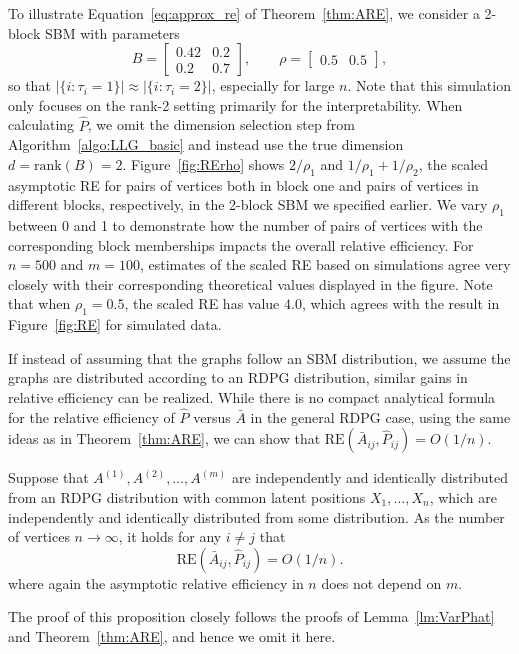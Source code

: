 To illustrate Equation~\ref{eq:approx_re} of Theorem~\ref{thm:ARE}, we consider a 2-block SBM with parameters
\begin{equation}
B = \begin{bmatrix}
0.42 & 0.2 \\
0.2 & 0.7
\end{bmatrix}
,\qquad \rho = \begin{bmatrix}
0.5 & 0.5
\end{bmatrix},
\label{eq:sim_setting}
\end{equation}
so that $|\{i:\tau_i=1\}| \approx |\{i:\tau_i=2\}|$, especially for large $n$.
Note that this simulation only focuses on the rank-2 setting primarily for the interpretability.
When calculating $\hat{P}$, we omit the dimension selection step from Algorithm~\ref{algo:LLG_basic} and instead use the true dimension $d = \mathrm{rank}(B) = 2$.
Figure~\ref{fig:RErho} shows $2/\rho_1$ and $1/\rho_1+1/\rho_2$, the scaled asymptotic RE for pairs of vertices both in block one and pairs of vertices in different blocks, respectively, in the 2-block SBM we specified earlier.
We vary $\rho_1$ between 0 and 1 to demonstrate how the number of pairs of vertices with the corresponding block memberships impacts the overall relative efficiency.
For $n=500$ and $m=100$, estimates of the scaled RE based on simulations agree very closely with their corresponding theoretical values displayed in the figure. Note that when $\rho_1 = 0.5$, the scaled RE has value $4.0$, which agrees with the result in Figure~\ref{fig:RE} for simulated data.


If instead of assuming that the graphs follow an SBM distribution, we assume the graphs are distributed according to an RDPG distribution, similar gains in relative efficiency can be realized.
While there is no compact analytical formula for the relative efficiency of $\hat{P}$ versus $\bar{A}$ in the general RDPG case, using the same ideas as in Theorem~\ref{thm:ARE}, we can show that $\mathrm{RE}(\bar{A}_{ij},\hat{P}_{ij}) = O(1/n)$.

\begin{proposition}
Suppose that $A^{(1)},A^{(2)},\dotsc,A^{(m)}$ are independently and identically distributed from an RDPG distribution with common latent positions $X_1,\dotsc,X_n$, which are independently and identically distributed from some distribution.
As the number of vertices $n \to \infty$, it holds for any $i\neq j$ that 
\[
    \mathrm{RE}(\bar{A}_{ij},\hat{P}_{ij}) = O(1/n).
\]
where again the asymptotic relative efficiency in $n$ does not depend on $m$.
\end{proposition}
The proof of this proposition closely follows the proofs of Lemma~\ref{lm:VarPhat} and Theorem~\ref{thm:ARE}, and hence we omit it here.

